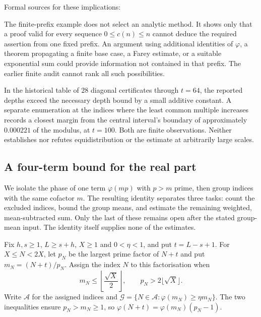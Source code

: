 Formal sources for these implications: 


\begin{rem}
\label{rem:b1-not-selector}
The finite-prefix example does not select an analytic method.
It shows only that a proof valid for every sequence $0\le c(n)\le n$
cannot deduce the required assertion from one fixed prefix. An argument
using additional identities of $\varphi$, a theorem propagating a finite
base case, a Farey estimate, or a suitable exponential sum could provide
information not contained in that prefix. The earlier finite audit cannot
rank all such possibilities.
\end{rem}

\begin{rem}
In the historical table of $28$ diagonal certificates through $t=64$,
the reported depths exceed the necessary depth bound by a small additive
constant. A separate enumeration at the indices where the least common
multiple increases records a closest margin from the central interval's
boundary of approximately $0.000221$ of the modulus, at $t=100$.
Both are finite observations. Neither establishes nor refutes
equidistribution or the estimate at arbitrarily large scales.
\end{rem}

\subsection{A four-term bound for the real part}\label{sub:four-sums}

We isolate the phase of one term $\varphi(mp)$ with $p>m$ prime,
then group indices with the same cofactor $m$. The resulting identity
separates three tasks: count the excluded indices, bound the group
means, and estimate the remaining weighted, mean-subtracted sum.
Only the last of these remains open after the stated group-mean input.
The identity itself supplies none of the estimates.

Fix $h,s\ge1$, $L\ge s+h$, $X\ge1$ and $0<\eta<1$, and put
$t=L-s+1$. For $X\le N<2X$, let $p_N$ be the largest prime factor of
$N+t$ and put $m_N=(N+t)/p_N$. Assign the index $N$ to this factorisation
when
\[
 m_N\le\left\lfloor\frac{\sqrt X}{2}\right\rfloor,
 \qquad p_N>2\lfloor\sqrt X\rfloor.
\]
Write $\mathcal A$ for the assigned indices and
$\mathcal G=\{N\in\mathcal A:\varphi(m_N)\ge\eta m_N\}$.
The two inequalities ensure $p_N>m_N\ge1$, so
$\varphi(N+t)=\varphi(m_N)(p_N-1)$.


